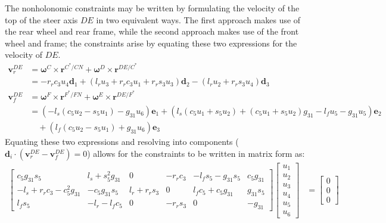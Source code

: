 \documentclass[letterpaper,11pt]{article}
\newcommand{\bs}[1]{ \boldsymbol{ #1 } }
\begin{document}
The nonholonomic constraints may be written by formulating the velocity of the
top of the steer axis $DE$ in two equivalent ways.  The first approach makes
use of the rear wheel and rear frame, while the second approach makes use of
the front wheel and frame; the constraints arise by equating these two
expressions for the velocity of $DE$.
\begin{align*}
  \bs{v}^{DE}_r & = \bs{\omega}^C \times \bs{r}^{C^* / CN} + \bs{\omega}^D
      \times \bs{r}^{DE / C^*} \\
      & = -r_r c_3 u_4 \bs{d}_1 + (l_r u_3 + r_r c_3 u_1 + r_r s_3 u_3)\bs{d}_2
      - (l_r u_2 + r_r s_3 u_4)\bs{d}_3 \\
    \bs{v}^{DE}_f & = \bs{\omega}^F \times \bs{r}^{F^* / FN} + \bs{\omega}^E
      \times \bs{r}^{DE / F^*} \\
      & = (-l_s (c_5 u_2 - s_5 u_1) - g_{31} u_6) \bs{e}_1 +
      (l_s (c_5 u_1 + s_5 u_2) + (c_5 u_1 + s_5 u_2) g_{31} - l_f u_5 -
        g_{31} u_5) \bs{e}_2 \\
        & \quad + (l_f (c_5 u_2 - s_5 u_1) + g_{31} u_6) \bs{e}_3
\end{align*}
Equating these two expressions and resolving into components ($\bs{d}_i \cdot
(\bs{v}^{DE}_r - \bs{v}^{DE}_f) = 0$) allows for the constraints to be written
in matrix form as:
\begin{align*}
  \left[
  \begin{array}{cccccc}
    c_5 g_{31} s_5 & l_s + s_5^2 g_{31} & 0 & -r_r c_3 & -l_f s_5 - g_{31} s_5
    & c_5 g_{31} \\
    -l_s + r_r c_3 - c_5^2 g_{31} & -c_5 g_{31} s_5 & l_r + r_r s_3 & 0 & l_f
    c_5 + c_5 g_{31} & g_{31} s_5 \\
    l_f s_5 & -l_r - l_f c_5 & 0 & -r_r s_3 & 0 & -g_{31}
  \end{array}
  \right]
  \left[
    \begin{array}{c}
      u_1 \\ u_2 \\ u_3 \\ u_4 \\ u_5 \\ u_6
    \end{array}
    \right]
  & =
  \left[
    \begin{array}{c}
      0 \\ 0 \\ 0
    \end{array}
    \right]
\end{align*}
\end{document}
